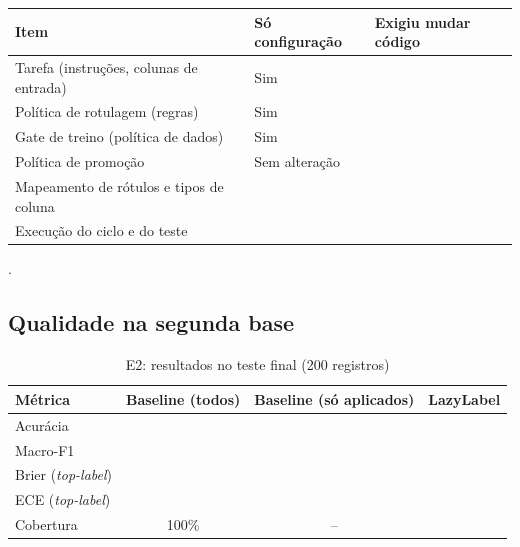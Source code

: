 \begin{quadro}[htb]
  \caption{E2: alterações em relação ao E1}
  \label{qua:e2-alteracoes}
  \small
  \begin{tabularx}{\textwidth}{|X|X|X|}
    \hline
    \textbf{Item} & \textbf{Só configuração} & \textbf{Exigiu mudar código} \\ \hline
    Tarefa (instruções, colunas de entrada) & Sim & \pendente{} \\ \hline
    Política de rotulagem (regras) & Sim & \pendente{} \\ \hline
    Gate de treino (política de dados) & Sim & \pendente{} \\ \hline
    Política de promoção & Sem alteração & \pendente{} \\ \hline
    Mapeamento de rótulos e tipos de coluna & \pendente{} & \pendente{} \\ \hline
    Execução do ciclo e do teste & \pendente{} & \pendente{} \\ \hline
  \end{tabularx}
\end{quadro}

.

\subsection{Qualidade na segunda base}

\begin{table}[htb]
  \centering
  \caption{E2: resultados no teste final (200 registros)}
  \label{tab:e2}
  \begin{tabular}{lccc}
    \toprule
    Métrica & Baseline (todos) & Baseline (só aplicados) & LazyLabel \\
    \midrule
    Acurácia & \pendente{} & \pendente{} & \pendente{} \\
    Macro-F1 & \pendente{} & \pendente{} & \pendente{} \\
    Brier (\emph{top-label}) & \pendente{} & \pendente{} & \pendente{} \\
    ECE (\emph{top-label}) & \pendente{} & \pendente{} & \pendente{} \\
    Cobertura & 100\% & -- & \pendente{} \\
    \bottomrule
  \end{tabular}
\end{table}

